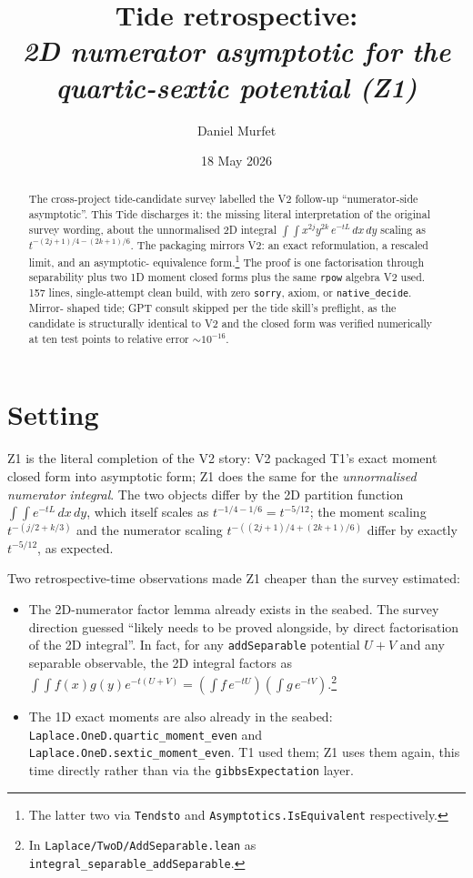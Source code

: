 \documentclass[11pt]{article}
\title{Tide retrospective:\\\emph{2D numerator asymptotic for the quartic-sextic potential (Z1)}}
\author{Daniel Murfet}
\date{18 May 2026}
\begin{document}
\maketitle

\begin{abstract}
The cross-project tide-candidate survey labelled the V2 follow-up
``numerator-side asymptotic''. This Tide discharges it: the missing
literal interpretation of the original survey wording, about the
unnormalised 2D integral $\int\!\int x^{2j} y^{2k}\,e^{-tL}\,dx\,dy$
scaling as $t^{-(2j+1)/4 - (2k+1)/6}$. The packaging mirrors V2:
an exact reformulation, a rescaled limit, and an asymptotic-
equivalence form.\footnote{The latter two via \texttt{Tendsto}
and \texttt{Asymptotics.IsEquivalent} respectively.} The proof is
one factorisation through separability plus two 1D moment closed
forms plus the same \texttt{rpow} algebra V2 used. 157 lines, single-attempt clean build,
with zero \texttt{sorry}, axiom, or \texttt{native\_decide}. Mirror-
shaped tide; GPT consult skipped per the tide skill's preflight, as
the candidate is structurally identical to V2 and the closed form was
verified numerically at ten test points to relative error
${\sim}10^{-16}$.
\end{abstract}

\section{Setting}

Z1 is the literal completion of the V2 story: V2 packaged T1's exact
moment closed form into asymptotic form; Z1 does the same for the
\emph{unnormalised numerator integral}. The two objects differ by the
2D partition function $\int\!\int e^{-tL}\,dx\,dy$, which itself
scales as $t^{-1/4 - 1/6} = t^{-5/12}$; the moment scaling
$t^{-(j/2 + k/3)}$ and the numerator scaling $t^{-((2j+1)/4 +
(2k+1)/6)}$ differ by exactly $t^{-5/12}$, as expected.

Two retrospective-time observations made Z1 cheaper than the survey
estimated:

\begin{itemize}[leftmargin=1.5em]
\item The 2D-numerator factor lemma already exists in the seabed.
  The survey direction guessed ``likely needs to be proved
  alongside, by direct factorisation of the 2D integral''. In fact,
  for any \texttt{addSeparable} potential $U + V$ and any separable
  observable, the 2D integral factors as
  $\int\!\int f(x) g(y) e^{-t(U + V)} = (\int f\,e^{-tU})(\int g\,
  e^{-tV})$.\footnote{In
  \texttt{Laplace/TwoD/AddSeparable.lean} as
  \texttt{integral\_separable\_addSeparable}.}
\item The 1D exact moments are also already in the seabed:
  \texttt{Laplace.OneD.quartic\_moment\_even} and
  \texttt{Laplace.OneD.sextic\_moment\_even}. T1 used them; Z1 uses
  them again, this time directly rather than via the
  \texttt{gibbsExpectation} layer.
\end{itemize}
\end{document}
